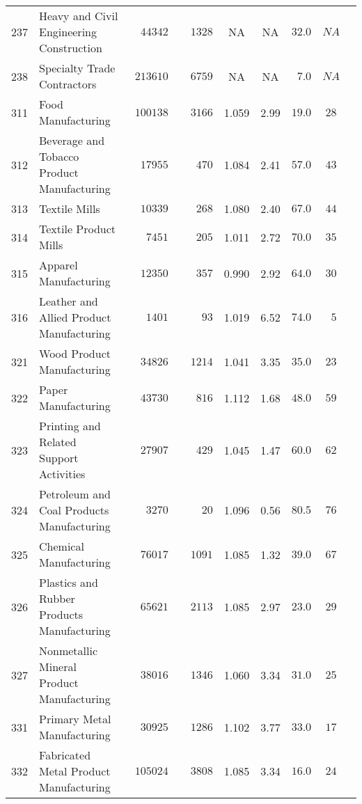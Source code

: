 \documentclass[9pt, oneside]{article}   	%
\begin{document}
\begin{longtable}{lp{3 in}ccccccc}
237  & Heavy and Civil Engineering Construction & $\phantom{00}44342$ & $\phantom{00}1328$ &    NA &    NA & $32.0$ & $NA$ \\
238  & Specialty Trade Contractors & $\phantom{0}213610$ & $\phantom{00}6759$ &    NA &    NA & $\phantom{0}7.0$ & $NA$ \\
311  & Food Manufacturing & $\phantom{0}100138$ & $\phantom{00}3166$ & 1.059 &  2.99 & $19.0$ & $28$ \\
312  & Beverage and Tobacco Product Manufacturing & $\phantom{00}17955$ & $\phantom{000}470$ & 1.084 &  2.41 & $57.0$ & $43$ \\
313  & Textile Mills & $\phantom{00}10339$ & $\phantom{000}268$ & 1.080 &  2.40 & $67.0$ & $44$ \\
314  & Textile Product Mills & $\phantom{000}7451$ & $\phantom{000}205$ & 1.011 &  2.72 & $70.0$ & $35$ \\
315  & Apparel Manufacturing & $\phantom{00}12350$ & $\phantom{000}357$ & 0.990 &  2.92 & $64.0$ & $30$ \\
316  & Leather and Allied Product Manufacturing & $\phantom{000}1401$ & $\phantom{0000}93$ & 1.019 &  6.52 & $74.0$ & $\phantom{0}5$ \\
321  & Wood Product Manufacturing & $\phantom{00}34826$ & $\phantom{00}1214$ & 1.041 &  3.35 & $35.0$ & $23$ \\
322  & Paper Manufacturing & $\phantom{00}43730$ & $\phantom{000}816$ & 1.112 &  1.68 & $48.0$ & $59$ \\
323  & Printing and Related Support Activities & $\phantom{00}27907$ & $\phantom{000}429$ & 1.045 &  1.47 & $60.0$ & $62$ \\
324  & Petroleum and Coal Products Manufacturing & $\phantom{000}3270$ & $\phantom{0000}20$ & 1.096 &  0.56 & $80.5$ & $76$ \\
325  & Chemical Manufacturing & $\phantom{00}76017$ & $\phantom{00}1091$ & 1.085 &  1.32 & $39.0$ & $67$ \\
326  & Plastics and Rubber Products Manufacturing & $\phantom{00}65621$ & $\phantom{00}2113$ & 1.085 &  2.97 & $23.0$ & $29$ \\
327  & Nonmetallic Mineral Product Manufacturing & $\phantom{00}38016$ & $\phantom{00}1346$ & 1.060 &  3.34 & $31.0$ & $25$ \\
331  & Primary Metal Manufacturing & $\phantom{00}30925$ & $\phantom{00}1286$ & 1.102 &  3.77 & $33.0$ & $17$ \\
332  & Fabricated Metal Product Manufacturing & $\phantom{0}105024$ & $\phantom{00}3808$ & 1.085 &  3.34 & $16.0$ & $24$ \\

\end{longtable}
\end{document}
